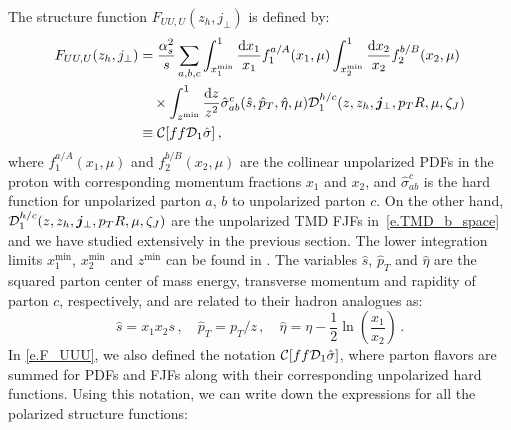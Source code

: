 \documentclass[a4paper, 11 pt]{article}
\begin{document}
The structure function $F_{UU, U}(z_h, j_{\perp})$ is defined by:
\begin{align}
F_{UU, U} (z_h, j_{\perp})
& =
\frac{\alpha _s^2}{s} \sum _{a, b, c}
\int _{x_1^{\min}}^1 \frac{\dd{x_1}}{x_1} f_1^{a/A}(x_1, \mu)
\int _{x_2^{\min}}^1 \frac{\dd{x_2}}{x_2} f_2^{b/B}(x_2, \mu)
\nonumber \\
& \quad \times
\int _{z^{\min}}^1 \frac{\dd{z}}{z^2}
\hat{\sigma}_{ab}^c \pqty{\hat{s}, \hat{p}_T, \hat{\eta}, \mu}
\mathcal{D}_1^{h/c} \pqty{z, z_h, \boldsymbol{j}_{\perp}, p_TR, \mu, \zeta_J}
\nonumber \\
& \equiv
\mathcal{C} \bqty{f f \mathcal{D}_1 \hat{\sigma}}
\, , \label{e.F_UUU}
\end{align}
where $f_1^{a/A} (x_1, \mu)$ and $f_2^{b/B} (x_2, \mu)$ are the collinear unpolarized PDFs in the proton with corresponding momentum fractions $x_1$ and $x_2$, and $\hat{\sigma}_{ab}^c$ is the hard function for unpolarized parton $a$, $b$ to unpolarized parton $c$. On the other hand, $\mathcal{D}_1^{h/c} \pqty{z, z_h, \boldsymbol{j}_{\perp}, p_TR, \mu, \zeta_J}$ are the unpolarized TMD FJFs in~\cref{e.TMD_b_space} and we have studied extensively in the previous section. The lower integration limits $x_1^{\min}$, $x_2^{\min}$ and $z^{\min}$ can be found in \cite{Kaufmann:2015hma, Kang:2016ehg}.
The variables $\hat{s}$, $\hat{p}_T$ and $\hat{\eta}$ are the squared parton center of mass energy, transverse momentum and rapidity of parton $c$, respectively, and are related to their hadron analogues as:
\begin{equation}
\hat{s} = x_1 x_2 s
\, ,
\quad
\hat{p}_T = p_T / z
\, ,
\quad
\hat{\eta} = \eta - \frac{1}{2} \ln(\frac{x_1}{x_2})
\, .
\end{equation}
In \cref{e.F_UUU}, we also defined the notation $\mathcal{C} \bqty{f f \mathcal{D}_1 \hat{\sigma}}$, where parton flavors are summed for PDFs and FJFs along with their corresponding unpolarized hard functions. Using this notation, we can write down the expressions for all the polarized structure functions:
\end{document}
